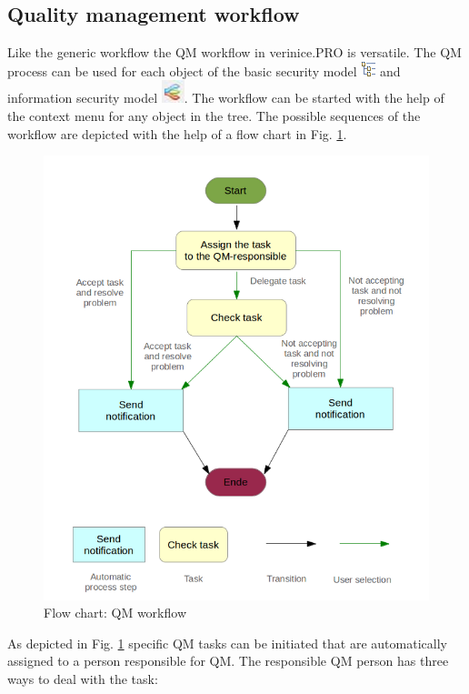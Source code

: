 \documentclass[a4paper,10pt]{book}
\begin{document}
\subsection{Quality management workflow}
Like the generic workflow the QM workflow in verinice.\textsc{PRO} is versatile.
The QM process can be used for each object of the basic security model
\includegraphics[height=2ex]{Icon/GS_Modell.png} and information security model  \includegraphics[height=2ex]{Icon/Informationssicherheitsmodell.png}.
The workflow can be started with the help of the context menu for any object in the tree.
The possible sequences of the workflow are depicted with the help of a flow chart in Fig. \ref{Flow chart: QM workflow}.
\begin{figure}[htb!]
  \centering
  \includegraphics[scale=.40]{Screenshot/Qm-workflow-en.png}
  \caption{\label{Flow chart: QM workflow} Flow chart: QM workflow}
\end{figure}
As depicted in Fig. \ref{Flow chart: QM workflow} specific QM tasks can be initiated that are automatically assigned to a person responsible for QM. The responsible QM person has three ways to deal with the task:
\end{document}
